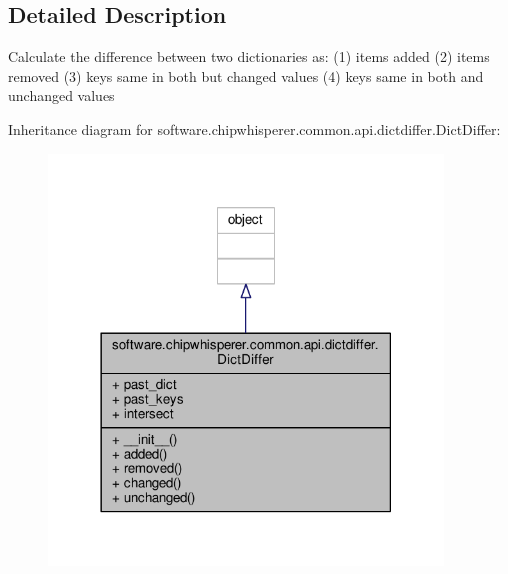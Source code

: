 \subsection{Detailed Description}
\begin{DoxyVerb}Calculate the difference between two dictionaries as:
(1) items added
(2) items removed
(3) keys same in both but changed values
(4) keys same in both and unchanged values
\end{DoxyVerb}
 

Inheritance diagram for software.\+chipwhisperer.\+common.\+api.\+dictdiffer.\+Dict\+Differ\+:\nopagebreak
\begin{figure}[H]
\begin{center}
\leavevmode
\includegraphics[width=297pt]{d8/d14/classsoftware_1_1chipwhisperer_1_1common_1_1api_1_1dictdiffer_1_1DictDiffer__inherit__graph}
\end{center}
\end{figure}


